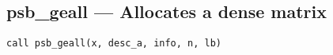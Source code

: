 

%
%
\clearpage\subsection*{psb\_geall --- Allocates a dense matrix}

\begin{verbatim}
call psb_geall(x, desc_a, info, n, lb)
\end{verbatim}


